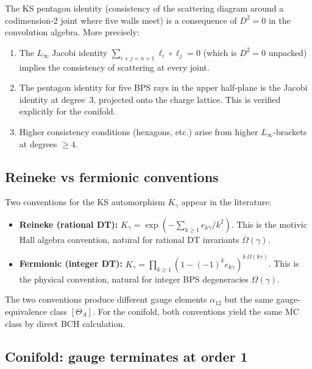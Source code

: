\documentclass[11pt]{article}
\theoremstyle{definition}
\theoremstyle{remark}
\newcommand{\Linf}{L_\infty}
\newcommand{\MC}{\mathrm{MC}}
\begin{document}
The KS pentagon identity (consistency of the scattering diagram
around a codimension-2 joint where five walls meet) is a
consequence of $D^2 = 0$ in the convolution algebra. More
precisely:

\begin{enumerate}[label=(\roman*)]
 \item The $\Linf$ Jacobi identity $\sum_{i+j = n+1}
 \ell_i \circ \ell_j = 0$ (which is $D^2 = 0$ unpacked) implies
 the consistency of scattering at every joint.

 \item The pentagon identity for five BPS rays in the upper
 half-plane is the Jacobi identity at degree~3, projected onto
 the charge lattice. This is verified explicitly for the conifold.

 \item Higher consistency conditions (hexagons, etc.) arise from
 higher $\Linf$-brackets at degrees $\geq 4$.
\end{enumerate}

\subsection{Reineke vs fermionic conventions}

Two conventions for the KS automorphism $K_\gamma$ appear in the
literature:

\begin{itemize}
 \item \textbf{Reineke (rational DT):}
 $K_\gamma = \exp(-\sum_{k \geq 1} e_{k\gamma}/k^2)$.
 This is the motivic Hall algebra convention, natural for
 rational DT invariants $\overline{\Omega}(\gamma)$.

 \item \textbf{Fermionic (integer DT):}
 $K_\gamma = \prod_{k \geq 1} (1 - (-1)^k e_{k\gamma})^{k\, \Omega(k\gamma)}$.
 This is the physical convention, natural for integer BPS
 degeneracies $\Omega(\gamma)$.
\end{itemize}

\noindent
The two conventions produce different gauge elements $\alpha_{12}$
but the same gauge-equivalence class $[\Theta_A]$. For the conifold,
both conventions yield the same $\overline{\MC}$ class by direct BCH
calculation.

\subsection{Conifold: gauge terminates at order 1}
\end{document}
